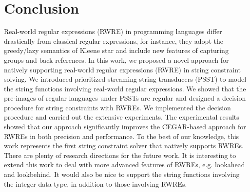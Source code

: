
\section{Conclusion}

Real-world regular expressions (RWRE) in programming languages differ drastically from classical regular expressions, for instance, they adopt the greedy/lazy semantics of Kleene star and include new features of capturing groups and back references. In this work, we proposed a novel approach for natively supporting real-world regular expressions (RWRE) in string constraint solving. We introduced prioritized streaming string transducers (PSST) to  model the string functions involving real-world regular expressions. We showed that the pre-images of regular languages under PSSTs are regular and designed a decision procedure for string constraints with RWREs. We implemented the decision procedure and carried out the extensive experiments. The experimental results showed that our approach significantly improves the CEGAR-based approach for RWREs in both precision and performance. To the best of our knowledge, this work represents the first string constraint solver that natively supports RWREs. There are plenty of research directions for the future work. It is interesting to extend this work to deal with more advanced features of RWREs, e.g. lookahead and lookbehind. It would also be nice to support the string functions involving the integer data type, in addition to those involving RWREs.

